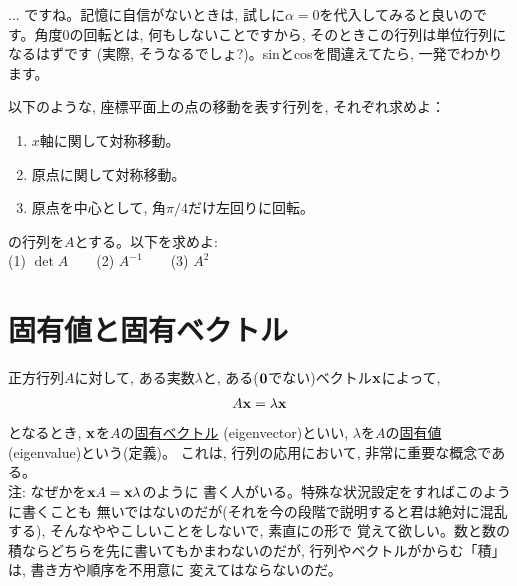 \begin{faq}{\small{}
... ですね。記憶に自信がないときは, 
試しに$\alpha=0$を代入してみると良いのです。角度0の回転とは,
 何もしないことですから, そのときこの行列は単位行列になるはずです
(実際, そうなるでしょ?)。sinとcosを間違えてたら, 一発でわかります。}\end{faq}

\begin{q}\label{q:matrix_lintrans2D4} 以下のような, 座標平面上の点の移動を表す行列を, それぞれ求めよ：
\begin{enumerate}
\item $x$軸に関して対称移動。
\item 原点に関して対称移動。
\item 原点を中心として, 角$\pi/4$だけ左回りに回転。
\end{enumerate}\end{q}
\mv

\begin{q}\label{q:matrix_lintrans2D6} の行列を$A$とする。以下を求めよ:\\
(1) $\det A$　　(2) $A^{-1}$　　(3) $A^2$\end{q}
\vv






\section{固有値と固有ベクトル}

正方行列$A$に対して, ある実数$\lambda$と, ある(${\bf 0}$でない)ベクトル${\bf x}$によって, 
\begin{eqnarray}
A{\bf x}=\lambda {\bf x}\label{eq:def_eigenvec}
\end{eqnarray}
となるとき, ${\bf x}$を$A$の\underline{固有ベクトル} (eigenvector)といい, 
$\lambda$を$A$の\underline{固有値} (eigenvalue)という(定義)。
これは, 行列の応用において, 非常に重要な概念である。\\

{\small 注: なぜかを${\bf x}A={\bf x}\lambda$のように
書く人がいる。特殊な状況設定をすればこのように書くことも
無いではないのだが(それを今の段階で説明すると君は絶対に混乱する), 
そんなややこしいことをしないで, 素直にの形で
覚えて欲しい。数と数の積ならどちらを先に書いてもかまわないのだが, 
行列やベクトルがからむ「積」は, 書き方や順序を不用意に
変えてはならないのだ。}

